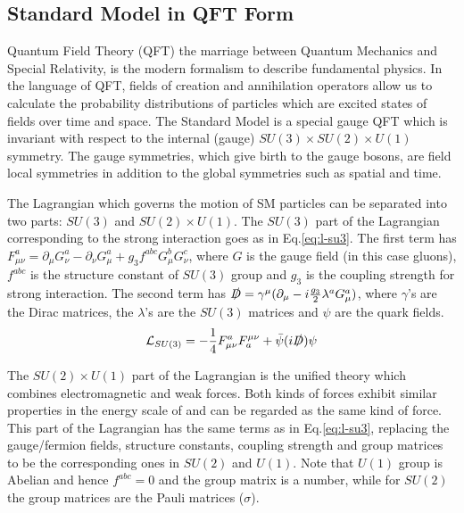\subsection{Standard Model in QFT Form}

Quantum Field Theory (QFT) the marriage between Quantum Mechanics and Special Relativity, is the modern formalism to describe fundamental physics. In the language of QFT, fields of creation and annihilation operators allow us to calculate the probability distributions of particles which are excited states of fields over time and space. The Standard Model is a special gauge QFT which is invariant with respect to the internal (gauge) $SU(3)\times SU(2)\times U(1)$ symmetry. The gauge symmetries, which give birth to the gauge bosons, are field local symmetries in addition to the global symmetries such as spatial and time. 

The Lagrangian which governs the motion of SM particles can be separated into two parts: $SU(3)$ and $SU(2)\times U(1)$. The $SU(3)$ part of the Lagrangian corresponding to the strong interaction goes as in Eq.\ref{eq:l-su3}. The first term has $F^{a}_{\mu\nu}  = \partial_{\mu}G^a_{\nu}-\partial_{\nu}G^a_{\mu}+g_3f^{abc}G^b_{\mu}G^c_{\nu}$, where $G$ is the gauge field (in this case gluons), $f^{abc}$ is the structure constant of $SU(3)$ group and $g_3$ is the coupling strength for strong interaction. The second term has $\slashed{D} = \gamma^{\mu}(\partial_{\mu}- i\frac{g_3}{2}\lambda^aG^a_{\mu})$, where $\gamma$'s are the Dirac matrices, the $\lambda$'s are the $SU(3)$ matrices and $\psi$ are the quark fields. 
\begin{equation}
  \mathcal{L}_{SU(3)} = -\frac{1}{4}F^{a}_{\mu\nu}F_{a}^{\mu\nu}+ \bar{\psi}(i\slashed{D}) \psi
  \label{eq:l-su3}
\end{equation}

The $SU(2)\times U(1)$ part of the Lagrangian is the unified theory which combines electromagnetic and weak forces. Both kinds of forces exhibit similar properties in the energy scale of \GeV and can be regarded as the same kind of force. This part of the Lagrangian has the same terms as in Eq.\ref{eq:l-su3}, replacing the gauge/fermion fields, structure constants, coupling strength and group matrices to be the corresponding ones in $SU(2)$ and $U(1)$. Note that $U(1)$ group is Abelian and hence $f^{abc}=0$ and the group matrix is a number, while for $SU(2)$ the group matrices are the Pauli matrices ($\sigma$). 
